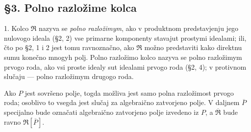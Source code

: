 \documentclass[11pt]{article}
\begin{document}
\setcounter{footnote}{22}

\subsection*{\S 3. Polno razložime kolca}

1. Kolco $\mathfrak R$ nazyva se \emph{polno razložimym}, ako v produktnom predstavjenju jego nulovogo ideala (§2, 2) vse primarne komponenty stavajut prostymi idealami; ili, čto po §2, 1 i 2 jest tomu ravnoznačno, ako $\mathfrak R$ možno predstaviti kako direktnu sumu konečno mnogyh polj. Polno razložimo kolco nazyva se polno razložimym prvogo roda, ako vsi proste idealy sut idealami prvogo roda (§2, 4); v protivnom slučaju --- polno razložimym drugogo roda.

Ako $P$ jest sovršeno polje, togda možliva jest samo polna razložimost prvogo roda; osoblivo to vsegda jest slučaj za algebraično zatvorjeno polje. V daljnem $\overline P$ specijalno bude označati algebraično zatvorjeno polje izvedeno iz $P$, a $\overline{\mathfrak R}$ bude ravno $\mathfrak R[\overline P]$.
\end{document}
